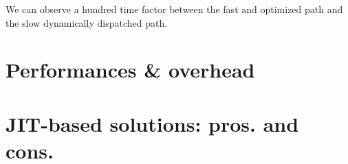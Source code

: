 We can observe a hundred time factor between the fast and optimized path and the slow dynamically dispatched path.

\section{Performances \& overhead}


\section{JIT-based solutions: pros. and cons.}

